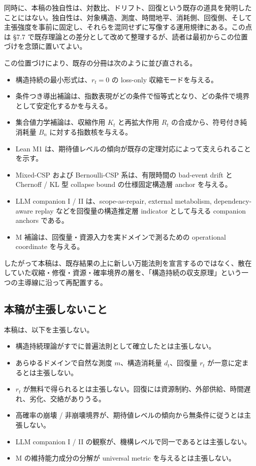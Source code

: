 \documentclass[12pt,a4paper]{article}
\begin{document}
同時に、本稿の独自性は、対数比、ドリフト、回復という既存の道具を発明したことにはない。独自性は、対象構造、測度、時間地平、消耗側、回復側、そして主張強度を事前に固定し、それらを混同せずに写像する運用規律にある。この点は §7.7 で既存理論との差分として改めて整理するが、読者は最初からこの位置づけを念頭に置いてよい。

この位置づけにより、既存の分冊は次のように並び直される。

\begin{itemize}
\tightlist
\item
  構造持続の最小形式は、\(r_{t}=0\) の loss-only 収縮モードを与える。
\item
  条件つき導出補論は、指数表現がどの条件で恒等式となり、どの条件で境界として安定化するかを与える。
\item
  集合値力学補論は、収縮作用 \(K_{t}\) と再拡大作用 \(R_{t}\) の合成から、符号付き純消耗量 \(B_{n}\) に対する指数核を与える。
\item
  Lean M1 は、期待値レベルの傾向が既存の定理対応によって支えられることを示す。
\item
  Mixed-CSP および Bernoulli-CSP 系は、有限時間の bad-event drift と Chernoff / KL 型 collapse bound の仕様固定構造層 anchor を与える。
\item
  LLM companion I / II は、scope-as-repair, external metabolism, dependency-aware replay などを回復量の構造推定層 indicator として与える companion anchors である。
\item
  M 補論は、回復量・資源入力を実ドメインで測るための operational coordinate を与える。
\end{itemize}

したがって本稿は、既存結果の上に新しい万能法則を宣言するのではなく、散在していた収縮・修復・資源・確率境界の層を、「構造持続の収支原理」という一つの主導線に沿って再配置する。

\subsection{本稿が主張しないこと}\label{ux672cux7a3fux304cux4e3bux5f35ux3057ux306aux3044ux3053ux3068}

本稿は、以下を主張しない。

\begin{itemize}
\tightlist
\item
  構造持続理論がすでに普遍法則として確立したとは主張しない。
\item
  あらゆるドメインで自然な測度 \(m\)、構造消耗量 \(d_{t}\)、回復量 \(r_{t}\) が一意に定まるとは主張しない。
\item
  \(r_{t}\) が無料で得られるとは主張しない。回復には資源制約、外部供給、時間遅れ、劣化、交絡がありうる。
\item
  高確率の崩壊 / 非崩壊境界が、期待値レベルの傾向から無条件に従うとは主張しない。
\item
  LLM companion I / II の観察が、機構レベルで同一であるとは主張しない。
\item
  M の維持能力成分の分解が universal metric を与えるとは主張しない。
\end{itemize}
\end{document}
